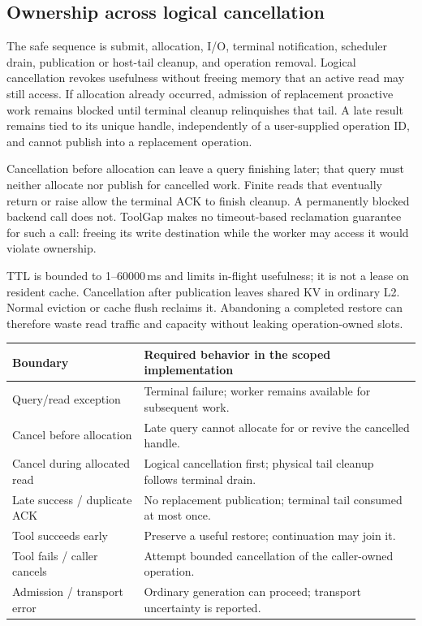 \documentclass[10pt,a4paper]{article}
\begin{document}
\subsection{Ownership across logical cancellation}
The safe sequence is submit, allocation, I/O, terminal notification, scheduler drain, publication or host-tail cleanup, and operation removal. Logical cancellation revokes usefulness without freeing memory that an active read may still access. If allocation already occurred, admission of replacement proactive work remains blocked until terminal cleanup relinquishes that tail. A late result remains tied to its unique handle, independently of a user-supplied operation ID, and cannot publish into a replacement operation.

Cancellation before allocation can leave a query finishing later; that query must neither allocate nor publish for cancelled work. Finite reads that eventually return or raise allow the terminal ACK to finish cleanup. A permanently blocked backend call does not. ToolGap makes no timeout-based reclamation guarantee for such a call: freeing its write destination while the worker may access it would violate ownership.

TTL is bounded to 1--60000\,ms and limits in-flight usefulness; it is not a lease on resident cache. Cancellation after publication leaves shared KV in ordinary L2. Normal eviction or cache flush reclaims it. Abandoning a completed restore can therefore waste read traffic and capacity without leaking operation-owned slots.

\begin{center}\small
\begin{tabularx}{\linewidth}{@{}p{41mm}X@{}}\toprule
Boundary & Required behavior in the scoped implementation\\\midrule
Query/read exception & Terminal failure; worker remains available for subsequent work.\\
Cancel before allocation & Late query cannot allocate for or revive the cancelled handle.\\
Cancel during allocated read & Logical cancellation first; physical tail cleanup follows terminal drain.\\
Late success / duplicate ACK & No replacement publication; terminal tail consumed at most once.\\
Tool succeeds early & Preserve a useful restore; continuation may join it.\\
Tool fails / caller cancels & Attempt bounded cancellation of the caller-owned operation.\\
Admission / transport error & Ordinary generation can proceed; transport uncertainty is reported.\\\bottomrule
\end{tabularx}\end{center}
\end{document}
